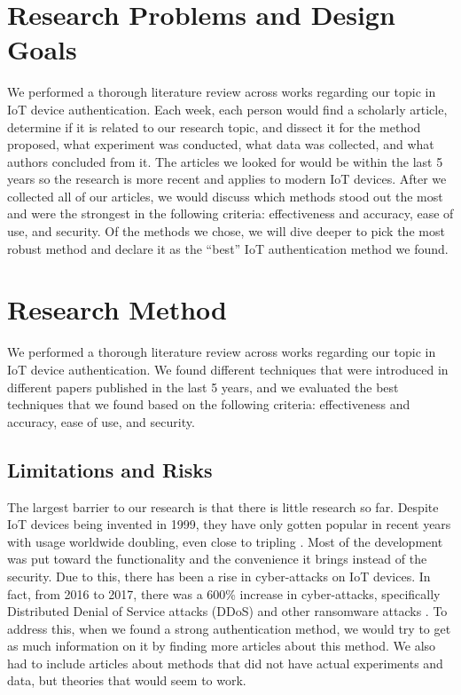 \documentclass[10pt,twocolumn,letterpaper]{article}
\begin{document}
\section{Research Problems and Design Goals}

We performed a thorough literature review across works regarding our topic in IoT device authentication. Each week, each person would find a scholarly article, determine if it is related to our research topic, and dissect it for the method proposed, what experiment was conducted, what data was collected, and what authors concluded from it. The articles we looked for would be within the last 5 years so the research is more recent and applies to modern IoT devices. After we collected all of our articles, we would discuss which methods stood out the most and were the strongest in the following criteria: effectiveness and accuracy, ease of use, and security. Of the methods we chose, we will dive deeper to pick the most robust method and declare it as the “best” IoT authentication method we found.

\section{Research Method}
We performed a thorough literature review across works regarding our topic in IoT device authentication. We found different techniques that were introduced in different papers published in the last 5 years, and we evaluated the best techniques that we found based on the following criteria: effectiveness and accuracy, ease of use, and security.

\subsection{Limitations and Risks}
The largest barrier to our research is that there is little research so far. Despite IoT devices being invented in 1999, they have only gotten popular in recent years with usage worldwide doubling, even close to tripling \cite{adhoc}. Most of the development was put toward the functionality and the convenience it brings instead of the security. Due to this, there has been a rise in cyber-attacks on IoT devices. In fact, from 2016 to 2017, there was a 600\% increase in cyber-attacks, specifically Distributed Denial of Service attacks (DDoS) and other ransomware attacks \cite{adhoc}. To address this, when we found a strong authentication method, we would try to get as much information on it by finding more articles about this method. We also had to include articles about methods that did not have actual experiments and data, but theories that would seem to work.
\end{document}
